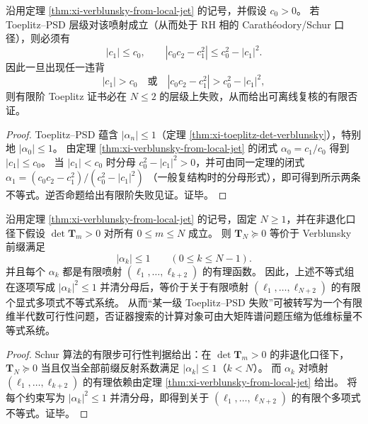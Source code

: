 \begin{corollary}\label{cor:xi-horizon-order2-reflection-falsifier}
沿用定理 \ref{thm:xi-verblunsky-from-local-jet} 的记号，并假设 \(c_0>0\)。
若 Toeplitz--PSD 层级对该喷射成立（从而处于 RH 相的 Carath\'eodory/Schur 口径），则必须有
\[
\boxed{\;
|c_1|\le c_0,\qquad
|c_0c_2-c_1^2|\le c_0^2-|c_1|^2.\;}
\]
因此一旦出现任一违背
\[
|c_1|>c_0
\quad\text{或}\quad
|c_0c_2-c_1^2|>c_0^2-|c_1|^2,
\]
则有限阶 Toeplitz 证书必在 \(N\le 2\) 的层级上失败，从而给出可离线复核的有限否证。
\end{corollary}
\begin{proof}
Toeplitz--PSD 蕴含 \(|\alpha_n|\le 1\)（定理 \ref{thm:xi-toeplitz-det-verblunsky}），特别地 \(|\alpha_0|\le 1\)。
由定理 \ref{thm:xi-verblunsky-from-local-jet} 的闭式
\(
\alpha_0=c_1/c_0
\)
得到 \(|c_1|\le c_0\)。
当 \(|c_1|<c_0\) 时分母 \(c_0^2-|c_1|^2>0\)，并可由同一定理的闭式
\(
\alpha_1=(c_0c_2-c_1^2)/(c_0^2-|c_1|^2)
\)
（一般复结构时的分母形式），即可得到所示两条不等式。逆否命题给出有限阶失败见证。证毕。
\end{proof}

\begin{corollary}\label{cor:xi-toeplitz-psd-jet-semialgebraic}
沿用定理 \ref{thm:xi-verblunsky-from-local-jet} 的记号，固定 \(N\ge 1\)，并在非退化口径下假设
\(\det\mathbf{T}_m>0\) 对所有 \(0\le m\le N\) 成立。
则 \(\mathbf{T}_N\succeq 0\) 等价于 Verblunsky 前缀满足
\[
|\alpha_k|\le 1\qquad(0\le k\le N-1).
\]
并且每个 \(\alpha_k\) 都是有限喷射 \((\ell_1,\dots,\ell_{k+2})\) 的有理函数。
因此，上述不等式组在逐项写成 \(|\alpha_k|^2\le 1\) 并清分母后，等价于关于有限喷射 \((\ell_1,\dots,\ell_{N+2})\) 的有限个显式多项式不等式系统。
从而“某一级 Toeplitz--PSD 失败”可被转写为一个有限维半代数可行性问题，否证器搜索的计算对象可由大矩阵谱问题压缩为低维标量不等式系统。
\end{corollary}
\begin{proof}
Schur 算法的有限步可行性判据给出：在 \(\det\mathbf{T}_m>0\) 的非退化口径下，\(\mathbf{T}_N\succeq 0\) 当且仅当全部前缀反射系数满足 \(|\alpha_k|\le 1\)（\(k<N\)）。
而 \(\alpha_k\) 对喷射 \((\ell_1,\dots,\ell_{k+2})\) 的有理依赖由定理 \ref{thm:xi-verblunsky-from-local-jet} 给出。
将每个约束写为 \(|\alpha_k|^2\le 1\) 并清分母，即得到关于 \((\ell_1,\dots,\ell_{N+2})\) 的有限个多项式不等式。证毕。
\end{proof}

